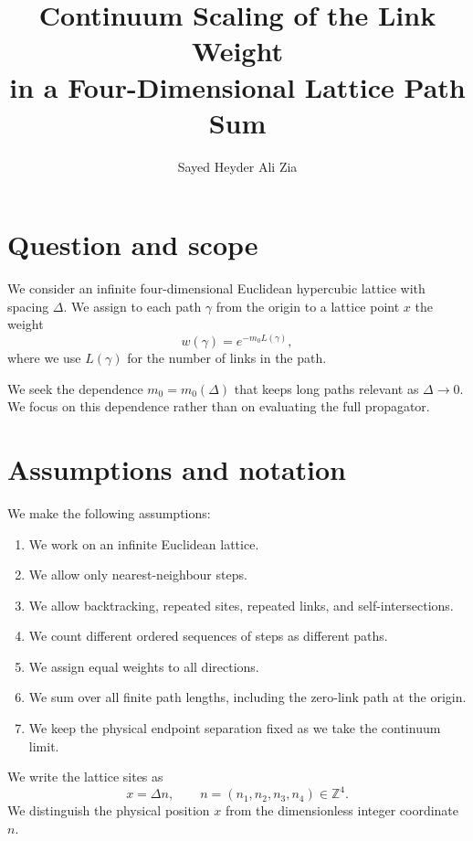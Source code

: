 \documentclass[11pt,a4paper]{article}
\title{Continuum Scaling of the Link Weight\\
in a Four-Dimensional Lattice Path Sum}
\author{Sayed Heyder Ali Zia}
\date{}
\numberwithin{equation}{section}
\begin{document}
\maketitle

\section{Question and scope}

We consider an infinite four-dimensional Euclidean
hypercubic lattice with spacing $\Delta$. We assign to
each path $\gamma$ from the origin to a lattice point
$x$ the weight
\begin{equation}
    w(\gamma)=e^{-m_0L(\gamma)},
\end{equation}
where we use $L(\gamma)$ for the number of links in
the path.

We seek the dependence $m_0=m_0(\Delta)$ that keeps
long paths relevant as $\Delta\to0$. We focus on this
dependence rather than on evaluating the full propagator.

\section{Assumptions and notation}

We make the following assumptions:
\begin{enumerate}[label=(\roman*)]
    \item We work on an infinite Euclidean lattice.
    \item We allow only nearest-neighbour steps.
    \item We allow backtracking, repeated sites,
    repeated links, and self-intersections.
    \item We count different ordered sequences of
    steps as different paths.
    \item We assign equal weights to all directions.
    \item We sum over all finite path lengths,
    including the zero-link path at the origin.
    \item We keep the physical endpoint separation
    fixed as we take the continuum limit.
\end{enumerate}

We write the lattice sites as
\begin{equation}
    x=\Delta n,
    \qquad
    n=(n_1,n_2,n_3,n_4)\in\mathbb Z^4.
\end{equation}
We distinguish the physical position $x$ from the
dimensionless integer coordinate $n$.
\end{document}
